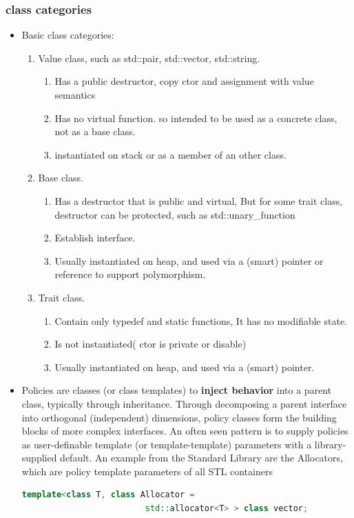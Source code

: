 \documentclass[a4paper,12pt,twoside]{book}
\begin{document}
\subsubsection{class categories}
\begin{itemize}
\item Basic class categories:
\begin{enumerate}
\item Value class, such as std::pair, std::vector, std::string.
\begin{enumerate}
\item Has a public destructor, copy ctor and assignment with value semantics
\item Has no virtual function. so intended to be used as a concrete class, not as a base class.
\item instantiated on stack or as a member of an other class.
\end{enumerate}

\item Base class.
\begin{enumerate}
\item Has a destructor that is public and virtual, But for some trait class, destructor can be protected, such as std::unary\_function
\item Establish interface.
\item Usually instantiated on heap, and used via a (smart) pointer or reference to support polymorphism.
\end{enumerate}

\item Trait class.
\begin{enumerate}
\item Contain only typedef and static functions, It has no modifiable state.
\item Is not instantiated( ctor is private or disable)
\item Usually instantiated on heap, and used via a (smart) pointer.
\end{enumerate}
\end{enumerate}

\item Policies are classes (or class templates) to \textbf{inject behavior} into a parent class, typically through inheritance. Through decomposing a parent interface into orthogonal (independent) dimensions, policy classes form the building blocks of more complex interfaces. An often seen pattern is to supply policies as user-definable template (or template-template) parameters with a library-supplied default. An example from the Standard Library are the Allocators, which are policy template parameters of all STL containers
\begin{lstlisting}[frame=single, language=c++]
template<class T, class Allocator =
                         std::allocator<T> > class vector;
\end{lstlisting}


\end{itemize}
\end{document}
